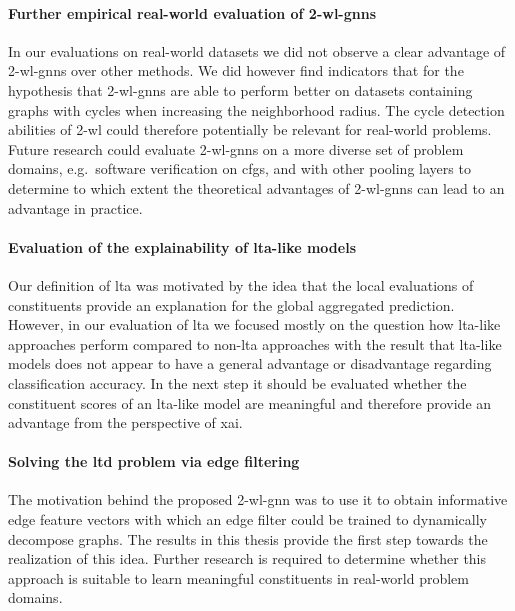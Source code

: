 \paragraph{Further empirical real-world evaluation of 2-\acs{wl}-\acsp{gnn}}
In our evaluations on real-world datasets we did not observe a clear advantage of 2-\acs{wl}-\acsp{gnn} over other methods.
We did however find indicators that for the hypothesis that 2-\acs{wl}-\acsp{gnn} are able to perform better on datasets containing graphs with cycles when increasing the neighborhood radius.
The cycle detection abilities of 2-\acs{wl} could therefore potentially be relevant for real-world problems.
Future research could evaluate 2-\acs{wl}-\acsp{gnn} on a more diverse set of problem domains, e.g.\ software verification on \acfp{cfg}, and with other pooling layers to determine to which extent the theoretical advantages of 2-\acs{wl}-\acsp{gnn} can lead to an advantage in practice.

\paragraph{Evaluation of the explainability of \acs{lta}-like models}
Our definition of \ac{lta} was motivated by the idea that the local evaluations of constituents provide an explanation for the global aggregated prediction.
However, in our evaluation of \ac{lta} we focused mostly on the question how \acs{lta}-like approaches perform compared to non-\acs{lta} approaches with the result that \acs{lta}-like models does not appear to have a general advantage or disadvantage regarding classification accuracy.
In the next step it should be evaluated whether the constituent scores of an \acs{lta}-like model are meaningful and therefore provide an advantage from the perspective of \acl{xai}.

\paragraph{Solving the \ac{ltd} problem via edge filtering}
The motivation behind the proposed 2-\acs{wl}-\acs{gnn} was to use it to obtain informative edge feature vectors with which an edge filter could be trained to dynamically decompose graphs.
The results in this thesis provide the first step towards the realization of this idea.
Further research is required to determine whether this approach is suitable to learn meaningful constituents in real-world problem domains.
